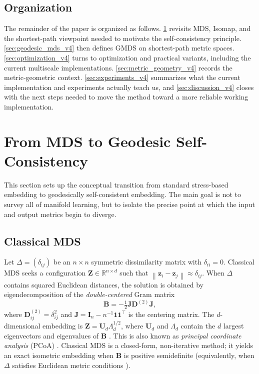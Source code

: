 \documentclass[twoside,11pt]{article}
\newcommand{\R}{\mathbb{R}}
\newcommand{\bz}{\mathbf{z}}
\newcommand{\bZ}{\mathbf{Z}}
\newcommand{\bD}{\mathbf{D}}
\newcommand{\bB}{\mathbf{B}}
\newcommand{\bI}{\mathbf{I}}
\newcommand{\bJ}{\mathbf{J}}
\newcommand{\bU}{\mathbf{U}}
\newcommand{\norm}[1]{\left\|#1\right\|}
\begin{document}
\subsection{Organization}

The remainder of the paper is organized as follows.
\cref{sec:background_v4} revisits MDS, Isomap, and the shortest-path
viewpoint needed to motivate the self-consistency principle.
\cref{sec:geodesic_mds_v4} then defines GMDS on shortest-path metric spaces.
\cref{sec:optimization_v4} turns to optimization and practical variants,
including the current multiscale implementations.  \cref{sec:metric_geometry_v4}
records the metric-geometric context.  \cref{sec:experiments_v4} summarizes
what the current implementation and experiments actually teach us, and
\cref{sec:discussion_v4} closes with the next steps needed to move the method
toward a more reliable working implementation.

\section{From MDS to Geodesic Self-Consistency}
\label{sec:background_v4}
\label{sec:background}

This section sets up the conceptual transition from standard stress-based
embedding to geodesically self-consistent embedding.  The main goal is not to
survey all of manifold learning, but to isolate the precise point at which the
input and output metrics begin to diverge.

\subsection{Classical MDS}
\label{sec:classical_mds}

Let $\Delta = (\delta_{ij})$ be an $n \times n$ symmetric dissimilarity
matrix with $\delta_{ii} = 0$.  Classical MDS
\citep{torgerson1952multidimensional, young1938discussion} seeks a
configuration $\bZ \in \R^{n \times d}$ such that
$\norm{\bz_i - \bz_j} \approx \delta_{ij}$.  When $\Delta$ contains
squared Euclidean distances, the solution is obtained by eigendecomposition
of the \emph{double-centered} Gram matrix
\begin{equation}
  \bB = -\tfrac{1}{2} \bJ \bD^{(2)} \bJ,
  \label{eq:gram}
\end{equation}
where $\bD^{(2)}_{ij} = \delta_{ij}^2$ and
$\bJ = \bI_n - n^{-1}\mathbf{1}\mathbf{1}^\top$ is the centering matrix.
The $d$-dimensional embedding is
$\bZ = \bU_d \Lambda_d^{1/2}$, where $\bU_d$ and $\Lambda_d$ contain the
$d$ largest eigenvectors and eigenvalues of $\bB$
\citep{eckart1936approximation, gower1966some}.
This is also known as \emph{principal coordinate analysis} (PCoA)
\citep{gower1966some}.  Classical MDS is a closed-form, non-iterative
method; it yields an exact isometric embedding when $\bB$ is positive
semidefinite (equivalently, when $\Delta$ satisfies Euclidean metric
conditions \citep{schoenberg1935remarks}).
\end{document}
